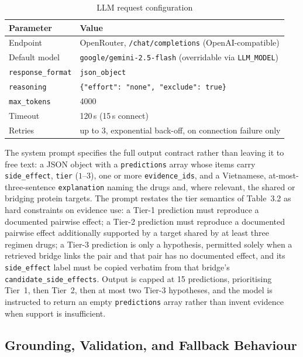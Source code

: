 \begin{table}[t]
  \caption{LLM request configuration}
  \label{tab:llm}
  \centering
  \begin{tabular}{@{}ll@{}}
    \toprule
    Parameter & Value \\
    \midrule
    Endpoint         & OpenRouter, \texttt{/chat/completions} (OpenAI-compatible) \\
    Default model    & \texttt{google/gemini-2.5-flash} (overridable via \texttt{LLM\_MODEL}) \\
    \texttt{response\_format} & \texttt{json\_object} \\
    \texttt{reasoning}        & \texttt{\{"effort": "none", "exclude": true\}} \\
    \texttt{max\_tokens}      & 4000 \\
    Timeout          & 120\,s (15\,s connect) \\
    Retries          & up to 3, exponential back-off, on connection failure only \\
    \bottomrule
  \end{tabular}
\end{table}

The system prompt specifies the full output contract rather than leaving it
to free text: a JSON object with a \texttt{predictions} array whose items
carry \texttt{side\_effect}, \texttt{tier} ($1$--$3$), one or more
\texttt{evidence\_ids}, and a Vietnamese, at-most-three-sentence
\texttt{explanation} naming the drugs and, where relevant, the shared or
bridging protein targets. The prompt restates the tier semantics of
Table~3.2 as hard constraints on evidence use: a Tier-1 prediction must
reproduce a documented pairwise effect; a Tier-2 prediction must reproduce a
documented pairwise effect additionally supported by a target shared by at
least three regimen drugs; a Tier-3 prediction is only a hypothesis,
permitted solely when a retrieved bridge links the pair and that pair has
no documented effect, and its \texttt{side\_effect} label must be copied
verbatim from that bridge's \texttt{candidate\_side\_effects}. Output is
capped at 15 predictions, prioritising Tier~1, then Tier~2, then at most two
Tier-3 hypotheses, and the model is instructed to return an empty
\texttt{predictions} array rather than invent evidence when support is
insufficient.

\subsection{Grounding, Validation, and Fallback Behaviour}
\label{sec:grounding}

